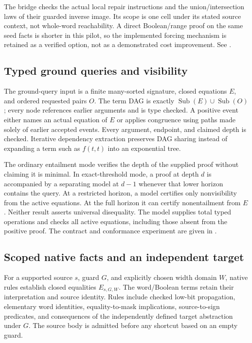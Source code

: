 The bridge checks the actual local repair instructions and the union/intersection laws of their guarded inverse image. Its scope is one cell under its stated source context, not whole-word reachability. A direct Boolean/range proof on the same seed facts is shorter in this pilot, so the implemented forcing mechanism is retained as a verified option, not as a demonstrated cost improvement. See .

\subsection{Typed ground queries and visibility}
The ground-query input is a finite many-sorted signature, closed equations $E$, and ordered requested pairs $O$. The term DAG is exactly $\operatorname{Sub}(E)\cup\operatorname{Sub}(O)$; every node references earlier arguments and is type checked. A positive event either names an actual equation of $E$ or applies congruence using paths made solely of earlier accepted events. Every argument, endpoint, and claimed depth is checked. Iterative dependency extraction preserves DAG sharing instead of expanding a term such as $f(t,t)$ into an exponential tree.

The ordinary entailment mode verifies the depth of the supplied proof without claiming it is minimal. In exact-threshold mode, a proof at depth $d$ is accompanied by a separating model at $d-1$ whenever that lower horizon contains the query. At a restricted horizon, a model certifies only nonvisibility from the active equations. At the full horizon it can certify nonentailment from $E$. Neither result asserts universal disequality. The model supplies total typed operations and checks all active equations, including those absent from the positive proof. The contract and conformance experiment are given in .

\subsection{Scoped native facts and an independent target}
For a supported source $s$, guard $G$, and explicitly chosen width domain $W$, native rules establish closed equalities $E_{s,G,W}$. The word/Boolean terms retain their interpretation and source identity. Rules include checked low-bit propagation, elementary word identities, equality-to-mask implications, source-to-sign predicates, and consequences of the independently defined target abstraction under $G$. The source body is admitted before any shortcut based on an empty guard.

